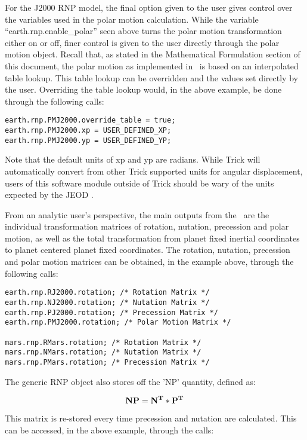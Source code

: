 For the J2000 RNP model, the final option given to the user gives control
over the variables used in the polar motion calculation. While the variable
``earth.rnp.enable\_polar'' seen above turns the polar motion transformation
either on or off, finer control is given to the user directly through the polar
motion object. Recall that, as stated in the Mathematical Formulation section
of this document, the polar motion as implemented in \JEODid\ is based on an
interpolated table lookup. This table lookup can be overridden and the values
set directly by the user. Overriding the table lookup would, in the above
example, be done through the following calls:

\begin{verbatim}
earth.rnp.PMJ2000.override_table = true;
earth.rnp.PMJ2000.xp = USER_DEFINED_XP;
earth.rnp.PMJ2000.yp = USER_DEFINED_YP;
\end{verbatim}

Note that the default units of xp and yp are radians. While Trick will
automatically convert from other Trick supported units for angular displacement,
users of this software module outside of Trick should be wary of the units
expected by the JEOD \ModelDesc.

From an analytic user's perspective, the main outputs from the \ModelDesc\ are
the individual transformation matrices of rotation, nutation, precession and
polar motion, as well as the total transformation from planet fixed inertial
coordinates to planet centered planet fixed coordinates.
The rotation, nutation, precession and polar motion matrices can be obtained,
in the example above, through the following calls:

\begin{verbatim}
earth.rnp.RJ2000.rotation; /* Rotation Matrix */
earth.rnp.NJ2000.rotation; /* Nutation Matrix */
earth.rnp.PJ2000.rotation; /* Precession Matrix */
earth.rnp.PMJ2000.rotation; /* Polar Motion Matrix */

mars.rnp.RMars.rotation; /* Rotation Matrix */
mars.rnp.NMars.rotation; /* Nutation Matrix */
mars.rnp.PMars.rotation; /* Precession Matrix */
\end{verbatim}

The generic RNP object also stores off the 'NP' quantity, defined as:

\begin{equation}\label{np_definition}
{\bf NP} = {\bf N^T} * {\bf P^T}
\end{equation}

This matrix is re-stored every time precession and nutation are calculated. This
can be accessed, in the above example, through the calls:

